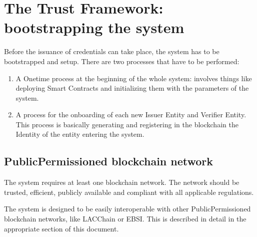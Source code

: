 \documentclass[letterpaper,10pt,english]{sphinxmanual}
\begin{document}
\section{The Trust Framework: bootstrapping the system}
\label{\detokenize{privacycred:the-trust-framework-bootstrapping-the-system}}
\sphinxAtStartPar
Before the issuance of credentials can take place, the system has to be bootstrapped and setup. There are two processes that have to be performed:
\begin{enumerate}
%
\item {} 
\sphinxAtStartPar
A One\sphinxhyphen{}time process at the beginning of the whole system: involves things like deploying Smart Contracts and initializing them with the parameters of the system.

\item {} 
\sphinxAtStartPar
A process for the onboarding of each new Issuer Entity and Verifier Entity. This process is basically generating and registering in the blockchain the Identity of the entity entering the system.

\end{enumerate}


\subsection{Public\sphinxhyphen{}Permissioned blockchain network}
\label{\detokenize{privacycred:public-permissioned-blockchain-network}}
\sphinxAtStartPar
The system requires at least one  blockchain network. The network should be trusted, efficient, publicly available and compliant with all applicable regulations.

\sphinxAtStartPar
The system is designed to be easily interoperable with other Public\sphinxhyphen{}Permissioned blockchain networks, like LACChain or EBSI. This is described in detail in the appropriate section of this document.
\end{document}
